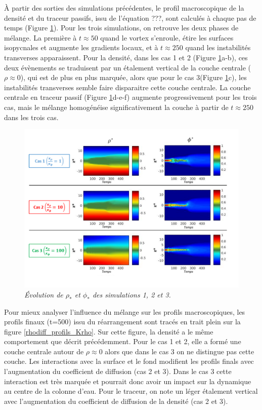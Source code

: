 \documentclass[a4paper,12pt]{article}
\begin{document}
    À partir des sorties des simulations précédentes, le profil macroscopique de la densité et du traceur passifs, issu de l'équation ???, sont calculés à chaque pas de temps (Figure \ref{rhodiff_star}). Pour les trois simulations, on retrouve les deux phases de mélange. La première à $t\approx50$ quand le vortex s'enroule, étire les surfaces isopycnales et augmente les gradients locaux, et à $t\approx250$ quand les instabilités transverses apparaissent. Pour la densité, dans les cas 1 et 2 (Figure \ref{rhodiff_star}a-b), ces deux évènements se traduisent par un étalement vertical de la couche centrale ($\rho\approx 0$), qui est de plus en plus marquée, alors que pour le cas 3(Figure \ref{rhodiff_star}c), les instabilités transverses semble faire disparaitre cette couche centrale. La couche centrale en traceur passif (Figure \ref{rhodiff_star}d-e-f) augmente progressivement pour les trois cas, mais le mélange homogénéise significativement la couche à partir de $t\approx 250$ dans les trois cas. 
    \\
    \begin{figure}[!h]
        \centering
        \includegraphics[width=0.9\linewidth]{figures/rhodiff_star.png}
        \caption{\textit{Évolution de $\rho_*$ et $\phi_*$ des simulations 1, 2 et 3.}}
        \label{rhodiff_star}
    \end{figure}
    Pour mieux analyser l'influence du mélange sur les profils macroscopiques, les profils finaux (t=500) issu du réarrangement sont tracés en trait plein sur la figure \ref{rhodiff_profils_Krho}. Sur cette figure, la densité a le même comportement que décrit précédemment. Pour le cas 1 et 2, elle a formé une couche centrale autour de $\rho\approx0$ alors que dans le cas 3 on ne distingue pas cette couche. Les interactions avec la surface et le fond modifient les profils finals avec l'augmentation du coefficient de diffusion (cas 2 et 3). Dans le cas 3 cette interaction est très marquée et pourrait donc avoir un impact sur la dynamique au centre de la colonne d'eau. Pour le traceur, on note un léger étalement vertical avec l'augmentation du coefficient de diffusion de la densité (cas 2 et 3).\\ 
    
\end{document}
